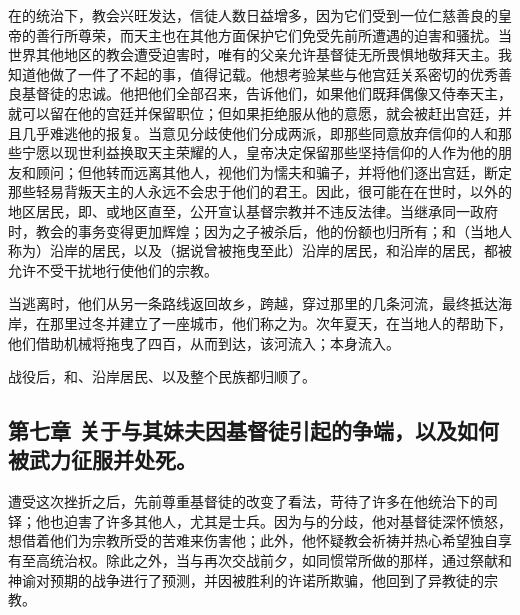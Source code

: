 在的统治下，教会兴旺发达，信徒人数日益增多，因为它们受到一位仁慈善良的皇帝的善行所尊荣，而天主也在其他方面保护它们免受先前所遭遇的迫害和骚扰。当世界其他地区的教会遭受迫害时，唯有的父亲允许基督徒无所畏惧地敬拜天主。我知道他做了一件了不起的事，值得记载。他想考验某些与他宫廷关系密切的优秀善良基督徒的忠诚。他把他们全部召来，告诉他们，如果他们既拜偶像又侍奉天主，就可以留在他的宫廷并保留职位；但如果拒绝服从他的意愿，就会被赶出宫廷，并且几乎难逃他的报复。当意见分歧使他们分成两派，即那些同意放弃信仰的人和那些宁愿以现世利益换取天主荣耀的人，皇帝决定保留那些坚持信仰的人作为他的朋友和顾问；但他转而远离其他人，视他们为懦夫和骗子，并将他们逐出宫廷，断定那些轻易背叛天主的人永远不会忠于他们的君王。因此，很可能在在世时，以外的地区居民，即、或地区直至，公开宣认基督宗教并不违反法律。当继承同一政府时，教会的事务变得更加辉煌；因为之子被杀后，他的份额也归所有；和（当地人称为）沿岸的居民，以及（据说曾被拖曳至此）沿岸的居民，和沿岸的居民，都被允许不受干扰地行使他们的宗教。\par

当逃离时，他们从另一条路线返回故乡，跨越，穿过那里的几条河流，最终抵达海岸，在那里过冬并建立了一座城市，他们称之为。次年夏天，在当地人的帮助下，他们借助机械将拖曳了四百，从而到达，该河流入；本身流入。\par

战役后，和、沿岸居民、以及整个民族都归顺了。\par


\subsection{第七章 关于与其妹夫因基督徒引起的争端，以及如何被武力征服并处死。}

遭受这次挫折之后，先前尊重基督徒的改变了看法，苛待了许多在他统治下的司铎；他也迫害了许多其他人，尤其是士兵。因为与的分歧，他对基督徒深怀愤怒，想借着他们为宗教所受的苦难来伤害他；此外，他怀疑教会祈祷并热心希望独自享有至高统治权。除此之外，当与再次交战前夕，如同惯常所做的那样，通过祭献和神谕对预期的战争进行了预测，并因被胜利的许诺所欺骗，他回到了异教徒的宗教。\par

